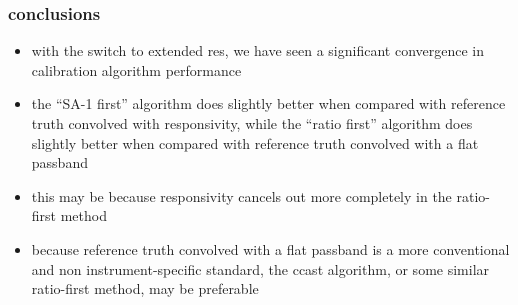 \documentclass[11pt]{beamer}
\begin{document}
\begin{frame}
\frametitle{conclusions}

\begin{itemize}

  \item with the switch to extended res, we have seen a significant
    convergence in calibration algorithm performance 


  \item the {\noaa} ``SA-1 first'' algorithm does slightly better
    when compared with reference truth convolved with responsivity,
    while the {\ccast} ``ratio first'' algorithm does slightly
    better when compared with reference truth convolved with a flat
    passband

  \item this may be because responsivity cancels out more completely
    in the ratio-first method

  \item because reference truth convolved with a flat passband is a
    more conventional and non instrument-specific standard, the
    ccast algorithm, or some similar ratio-first method, may be
    preferable

\end{itemize}

\end{frame}
\end{document}
